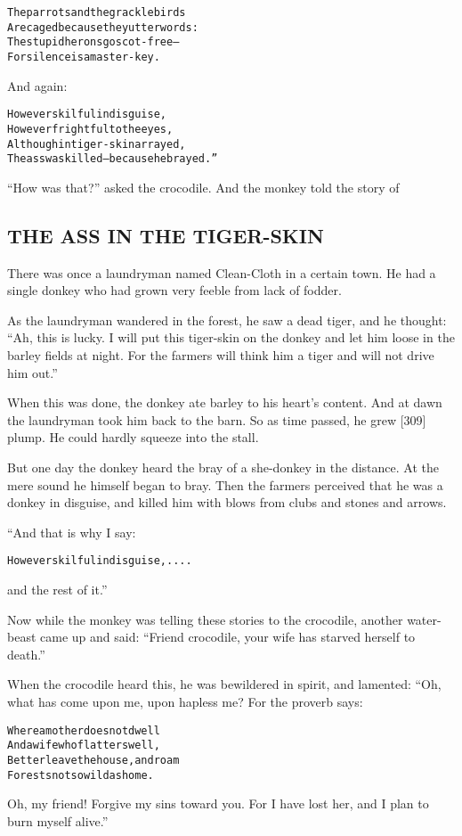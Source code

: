 \documentclass{article}
\renewenvironment{verbatim}{\begin{alltt}\normalfont\begin{centering}}{\end{centering}\end{alltt}}
\begin{document}
\begin{verbatim}
The parrots and the grackle birds
Are caged because they utter words:
The stupid herons go scot-free--
For silence is a master-key.
\end{verbatim}
And again:

\begin{verbatim}
However skilful in disguise,
However frightful to the eyes,
Although in tiger-skin arrayed,
The ass was killed--because he brayed.”
\end{verbatim}
``How was that?'' asked the crocodile. And the monkey told the
story of

\subsection{THE ASS IN THE TIGER-SKIN}

There was once a laundryman named Clean-Cloth in a certain town. He
had a single donkey who had grown very feeble from lack of fodder.

As the laundryman wandered in the forest, he saw a dead tiger, and
he thought:
``Ah, this is lucky. I will put this tiger-skin on the donkey and let him loose in the barley fields at night. For the farmers will think him a tiger and will not drive him out.''

When this was done, the donkey ate barley to his heart's content.
And at dawn the laundryman took him back to the barn. So as time
passed, he grew [309] plump. He could hardly squeeze into the
stall.

But one day the donkey heard the bray of a she-donkey in the
distance. At the mere sound he himself began to bray. Then the
farmers perceived that he was a donkey in disguise, and killed him
with blows from clubs and stones and arrows.

“And that is why I say:

\begin{verbatim}
However skilful in disguise, ....
\end{verbatim}
and the rest of it.”

Now while the monkey was telling these stories to the crocodile,
another water-beast came up and said:
``Friend crocodile, your wife has starved herself to death.''

When the crocodile heard this, he was bewildered in spirit, and
lamented: “Oh, what has come upon me, upon hapless me? For the
proverb says:

\begin{verbatim}
Where a mother does not dwell
And a wife who flatters well,
Better leave the house, and roam
Forests not so wild as home.
\end{verbatim}
Oh, my friend! Forgive my sins toward you. For I have lost her, and
I plan to burn myself alive.”
\end{document}
